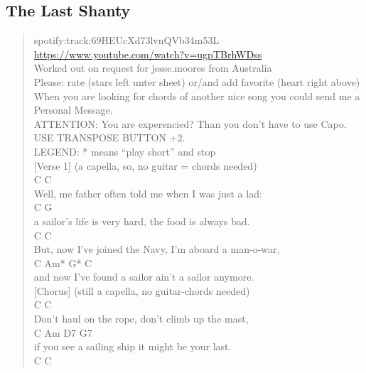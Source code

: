 \documentclass[11pt]{article}
\begin{document}
\subsection{The Last Shanty}
\label{sec:org54f0fd5}
\begin{verse}
spotify:track:69HEUcXd73lvnQVb34m53L\\
\url{https://www.youtube.com/watch?v=ugpTBrhWDss}\\
Worked out on request for jesse.moores from Australia\\
Please: rate (stars left unter sheet) or/and add favorite (heart right above)\\
When you are looking for chords of another nice song you could send me a Personal Message.\\
ATTENTION: You are experencied? Than you don't have to use Capo. USE TRANSPOSE BUTTON +2.\\
LEGEND: * means ``play short'' and stop\\
\vspace*{1em}
[Verse 1] (a capella, so, no guitar = chords needed)\\
\hspace*{9em}C                         C\\
Well, me father often told me when I was just a lad:\\
\hspace*{2em}C                               G\\
a sailor's life is very hard, the food is always bad.\\
\hspace*{5em}C                              C\\
But, now I've joined the Navy, I'm aboard a man-o-war,\\
\hspace*{4em}C                               Am*    G* C\\
and now I've found a sailor ain't a sailor anymore.\\
\vspace*{1em}
[Chorus] (still a capella, no guitar-chords needed)\\
\hspace*{6em}C                       C\\
Don't haul on the rope, don't climb up the mast,\\
C            Am              D7            G7\\
if you see a sailing ship it might be your last.\\
\hspace*{5em}C                           C\\

\end{verse}
\end{document}
